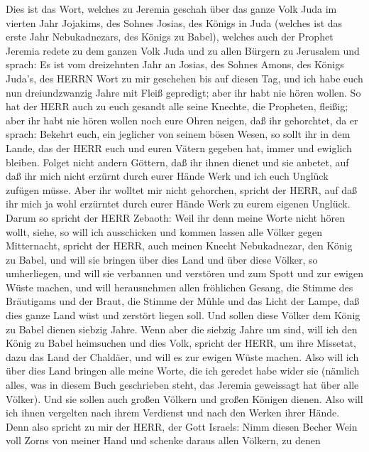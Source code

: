 Dies ist das Wort, welches zu Jeremia geschah über das
ganze Volk Juda im vierten Jahr Jojakims, des Sohnes Josias, des Königs
in Juda (welches ist das erste Jahr Nebukadnezars, des Königs zu Babel),
 welches auch der Prophet Jeremia redete zu dem ganzen Volk
Juda und zu allen Bürgern zu Jerusalem und sprach:  Es ist
vom dreizehnten Jahr an Josias, des Sohnes Amons, des Königs Juda's, des
HERRN Wort zu mir geschehen bis auf diesen Tag, und ich habe euch nun
dreiundzwanzig Jahre mit Fleiß gepredigt; aber ihr habt nie hören
wollen.  So hat der HERR auch zu euch gesandt alle seine
Knechte, die Propheten, fleißig; aber ihr habt nie hören wollen noch
eure Ohren neigen, daß ihr gehorchtet,  da er sprach:
Bekehrt euch, ein jeglicher von seinem bösen Wesen, so sollt ihr in dem
Lande, das der HERR euch und euren Vätern gegeben hat, immer und
ewiglich bleiben.  Folget nicht andern Göttern, daß ihr
ihnen dienet und sie anbetet, auf daß ihr mich nicht erzürnt durch eurer
Hände Werk und ich euch Unglück zufügen müsse.  Aber ihr
wolltet mir nicht gehorchen, spricht der HERR, auf daß ihr mich ja wohl
erzürntet durch eurer Hände Werk zu eurem eigenen Unglück. 
Darum so spricht der HERR Zebaoth: Weil ihr denn meine Worte nicht hören
wollt,  siehe, so will ich ausschicken und kommen lassen
alle Völker gegen Mitternacht, spricht der HERR, auch meinen Knecht
Nebukadnezar, den König zu Babel, und will sie bringen über dies Land
und über diese Völker, so umherliegen, und will sie verbannen und
verstören und zum Spott und zur ewigen Wüste machen,  und
will herausnehmen allen fröhlichen Gesang, die Stimme des Bräutigams und
der Braut, die Stimme der Mühle und das Licht der Lampe, 
daß dies ganze Land wüst und zerstört liegen soll. Und sollen diese
Völker dem König zu Babel dienen siebzig Jahre.  Wenn aber
die siebzig Jahre um sind, will ich den König zu Babel heimsuchen und
dies Volk, spricht der HERR, um ihre Missetat, dazu das Land der
Chaldäer, und will es zur ewigen Wüste machen.  Also will
ich über dies Land bringen alle meine Worte, die ich geredet habe wider
sie (nämlich alles, was in diesem Buch geschrieben steht, das Jeremia
geweissagt hat über alle Völker).  Und sie sollen auch
großen Völkern und großen Königen dienen. Also will ich ihnen vergelten
nach ihrem Verdienst und nach den Werken ihrer Hände.  Denn
also spricht zu mir der HERR, der Gott Israels: Nimm diesen Becher Wein
voll Zorns von meiner Hand und schenke daraus allen Völkern, zu denen
